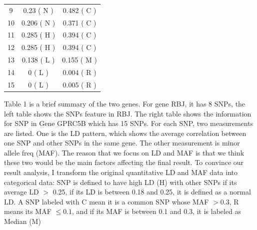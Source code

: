 \documentclass{article}
\begin{document}
\begin{table}[htbp]
{\begin{minipage}[b]{0.4 \textwidth}
\begin{tabular}{c|cc}
                        9	&	0.23	(	N	)&	0.482	(	C	)\\
                        10	&	0.206	(	N	)&	0.371	(	C	)\\
                        11	&	0.285	(	H	)&	0.394	(	C	)\\
                        12	&	0.285	(	H	)&	0.394	(	C	)\\
                        13	&	0.138	(	L	)&	0.155	(	M	)\\
                        14	&	0	(	L	)&	0.004	(	R	)\\
                        15	&	0	(	L	)&	0.005	(	R	)\\
                        \bottomrule
                    \end{tabular}
                \end{minipage}
            }
        \end{table}

        Table 1 is a brief summary of the two genes. For gene RBJ, it has 8 SNPs, the left table shows the SNPs feature in RBJ. The right table shows the information for SNP in Gene GPRC5B which has 15 SNPs. For each SNP, two measurements are listed. One is the LD pattern, which shows the average correlation between one SNP and other SNPs in the same gene. The other measurement is minor allele freq (MAF). The reason that we focus on LD and MAF is that we think these two would be the main factors affecting the final result. To convince our result analysis, I transform the original quantitative LD and MAF data into categorical data: SNP is defined to have high LD (H) with other SNPs if its average LD $>$ 0.25, if its LD is between 0.18 and 0.25, it is defined as a normal LD. A SNP labeled with C mean it is a common SNP whose MAF $>0.3$,  R means its MAF $\leq 0.1$, and if its MAF is between 0.1 and 0.3, it is labeled as Median (M)
\end{document}
